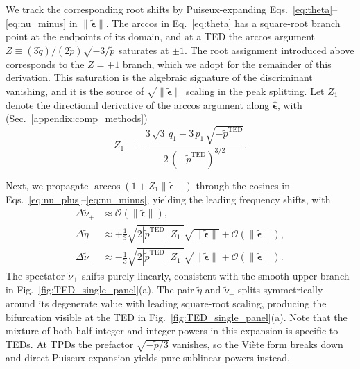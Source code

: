 \documentclass[%
  reprint,
  amsmath,amssymb,
  aps,
  prapplied,
  superscriptaddress,
  longbibliography]{revtex4-2}
\begin{document}
We track the corresponding root shifts by Puiseux-expanding Eqs.~\ref{eq:theta}--\ref{eq:nu_minus} in $\lVert\boldsymbol{\tilde{\epsilon}}\rVert$. The arccos in Eq.~\ref{eq:theta} has a square-root branch point at the endpoints of its domain, and at a TED the arccos argument $Z \equiv (3\tilde{q})/(2\tilde{p})\sqrt{-3/\tilde{p}}$ saturates at $\pm 1$. The root assignment introduced above corresponds to the $Z = +1$ branch, which we adopt for the remainder of this derivation. This saturation is the algebraic signature of the discriminant vanishing, and it is the source of $\sqrt{\lVert\boldsymbol{\tilde{\epsilon}}\rVert}$ scaling in the peak splitting. Let $Z_1$ denote the directional derivative of the arccos argument along $\boldsymbol{\hat{\epsilon}}$, with (Sec.~\ref{appendix:comp_methods})
\begin{equation}\label{eq:Z1_def}
    Z_1 \equiv -\frac{3\,\sqrt{3}\,q_1 -3\,p_1 \,\sqrt{-\tilde{p}^\text{TED} }}{2\,{{\left(-\tilde{p}^\text{TED} \right)}}^{3/2} }.
\end{equation}

Next, we propagate $\arccos(1 + Z_1 \lVert \boldsymbol{\tilde{\epsilon}} \rVert)$ through the cosines in Eqs.~\ref{eq:nu_plus}--\ref{eq:nu_minus}, yielding the leading frequency shifts, with
\begin{align}
    \Delta\tilde{\nu}_+ &\approx \mathcal{O}(\lVert\boldsymbol{\tilde{\epsilon}}\rVert), \label{eq:ted_spectator_shift}\\
    \Delta\tilde{\eta} &\approx +\frac{1}{3}\sqrt{2|\tilde{p}^\text{TED}||Z_1|}\sqrt{\lVert\boldsymbol{\tilde{\epsilon}}\rVert} + \mathcal{O}(\lVert\boldsymbol{\tilde{\epsilon}}\rVert), \label{eq:ted_eta_shift}\\
    \Delta\tilde{\nu}_- &\approx -\frac{1}{3}\sqrt{2|\tilde{p}^\text{TED}||Z_1|}\sqrt{\lVert\boldsymbol{\tilde{\epsilon}}\rVert} + \mathcal{O}(\lVert\boldsymbol{\tilde{\epsilon}}\rVert). \label{eq:ted_nu_minus_shift}
\end{align}
The spectator $\tilde{\nu}_+$ shifts purely linearly, consistent with the smooth upper branch in Fig.~\ref{fig:TED_single_panel}(a). The pair $\tilde{\eta}$ and $\tilde{\nu}_-$ splits symmetrically around its degenerate value with leading square-root scaling, producing the bifurcation visible at the TED in Fig.~\ref{fig:TED_single_panel}(a). Note that the mixture of both half-integer and integer powers in this expansion is specific to TEDs. At TPDs the prefactor $\sqrt{-\tilde{p}/3}$ vanishes, so the Viète form breaks down and direct Puiseux expansion yields pure sublinear powers instead.
\end{document}
